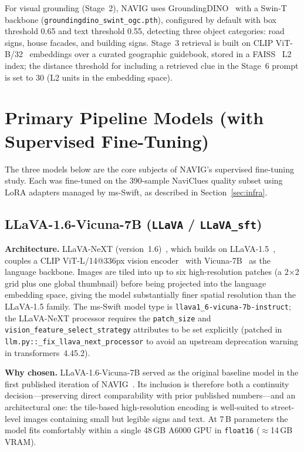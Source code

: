 \documentclass[11pt]{article}
\begin{document}
For visual grounding (Stage~2), NAVIG uses GroundingDINO~\citep{Liu2023GroundingDINO} with
a Swin-T backbone (\texttt{groundingdino\_swint\_ogc.pth}), configured by default with
box threshold 0.65 and text threshold 0.55, detecting three object categories: road signs,
house facades, and building signs. Stage~3 retrieval is built on CLIP
ViT-B/32~\citep{Radford2021CLIP} embeddings over a curated geographic guidebook, stored in
a FAISS~\citep{Johnson2021FAISS} L2 index; the distance threshold for including a retrieved
clue in the Stage~6 prompt is set to 30 (L2 units in the embedding space).

\section{Primary Pipeline Models (with Supervised Fine-Tuning)}
\label{sec:primary}

The three models below are the core subjects of NAVIG's supervised fine-tuning study.
Each was fine-tuned on the 390-sample NaviClues quality subset using LoRA adapters managed
by ms-Swift, as described in Section~\ref{sec:infra}.

\subsection{LLaVA-1.6-Vicuna-7B (\texttt{LLaVA} / \texttt{LLaVA\_sft})}

\textbf{Architecture.} LLaVA-NeXT (version~1.6)~\citep{Liu2024LLaVANeXT}, which builds
on LLaVA-1.5~\citep{Liu2024LLaVA15}, couples a CLIP ViT-L/14@336px vision
encoder~\citep{Radford2021CLIP} with Vicuna-7B~\citep{Chiang2023Vicuna} as the language
backbone. Images are tiled into up to six high-resolution patches (a 2$\times$2 grid plus
one global thumbnail) before being projected into the language embedding space, giving the
model substantially finer spatial resolution than the LLaVA-1.5 family. The ms-Swift model
type is \texttt{llava1\_6-vicuna-7b-instruct}; the LLaVA-NeXT processor requires the
\texttt{patch\_size} and \texttt{vision\_feature\_select\_strategy} attributes to be set
explicitly (patched in \texttt{llm.py::\_fix\_llava\_next\_processor} to avoid an upstream
deprecation warning in transformers~4.45.2).

\textbf{Why chosen.} LLaVA-1.6-Vicuna-7B served as the original baseline model in the
first published iteration of NAVIG~\citep{Yu2025NAVIG}. Its inclusion is therefore both a
continuity decision---preserving direct comparability with prior published numbers---and an
architectural one: the tile-based high-resolution encoding is well-suited to street-level
images containing small but legible signs and text. At 7\,B parameters the model fits
comfortably within a single 48\,GB A6000 GPU in \texttt{float16} ($\approx$14\,GB VRAM).
\end{document}
